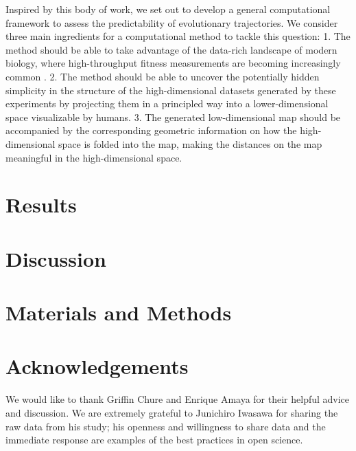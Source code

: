 \documentclass[
]{scrartcl}
\begin{document}
\begin{refsegment}
Inspired by this body of work, we set out to develop a general
computational framework to assess the predictability of evolutionary
trajectories. We consider three main ingredients for a computational
method to tackle this question: 1. The method should be able to take
advantage of the data-rich landscape of modern biology, where
high-throughput fitness measurements are becoming increasingly common
\autocite{kinsler2020,maeda2020,iwasawa2022}. 2. The method should be
able to uncover the potentially hidden simplicity in the structure of
the high-dimensional datasets generated by these experiments by
projecting them in a principled way into a lower-dimensional space
visualizable by humans. 3. The generated low-dimensional map should be
accompanied by the corresponding geometric information on how the
high-dimensional space is folded into the map, making the distances on
the map meaningful in the high-dimensional space.

\section{Results}\label{results}

\section{Discussion}\label{discussion}

\section*{Materials and Methods}\label{materials-and-methods}

\section*{Acknowledgements}\label{acknowledgements}

We would like to thank Griffin Chure and Enrique Amaya for their helpful
advice and discussion. We are extremely grateful to Junichiro Iwasawa
for sharing the raw data from his study; his openness and willingness to
share data and the immediate response are examples of the best practices
in open science.

\printbibliography[segment=\therefsegment]
\end{refsegment}

\clearpage
\end{document}
